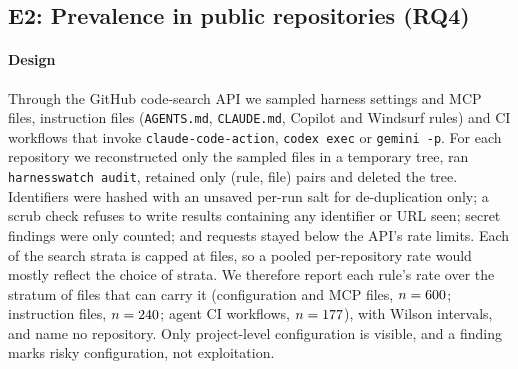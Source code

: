 \subsection{E2: Prevalence in public repositories (RQ4)}\label{sec:eval-e2}
\paragraph*{Design} Through the GitHub code-search API we sampled harness settings and MCP files, instruction files (\texttt{AGENTS.md}, \texttt{CLAUDE.md}, Copilot and Windsurf rules) and CI workflows that invoke \texttt{claude-code-action}, \texttt{codex exec} or \texttt{gemini -p}. For each repository we reconstructed only the sampled files in a temporary tree, ran \texttt{harnesswatch audit}, retained only (rule, file) pairs and deleted the tree. Identifiers were hashed with an unsaved per-run salt for de-duplication only; a scrub check refuses to write results containing any identifier or URL seen; secret findings were only counted; and requests stayed below the API's rate limits. Each of the \eTwoTargets{} search strata is capped at \eTwoCapPerTarget{} files, so a pooled per-repository rate would mostly reflect the choice of strata. We therefore report each rule's rate over the stratum of files that can carry it (configuration and MCP files, $n=600$; instruction files, $n=240$; agent CI workflows, $n=177$), with Wilson intervals, and name no repository. Only project-level configuration is visible, and a finding marks risky configuration, not exploitation.

